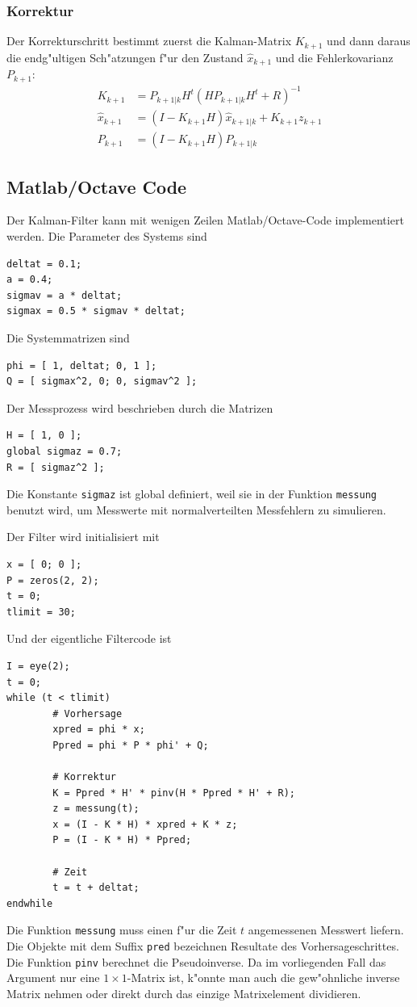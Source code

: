 \subsubsection{Korrektur}
Der Korrekturschritt bestimmt zuerst die Kalman-Matrix $K_{k+1}$ und
dann daraus die endg"ultigen Sch"atzungen f"ur den Zustand
$\hat x_{k+1}$ und die Fehlerkovarianz $P_{k+1}$:
\begin{align*}
K_{k+1}&=P_{k+1|k}H^t(HP_{k+1|k}H^t+R)^{-1}
\\
\hat x_{k+1}&= (I-K_{k+1}H)\hat x_{k+1|k} + K_{k+1}z_{k+1}
\\
P_{k+1}&=(I-K_{k+1}H)P_{k+1|k}
\end{align*}

\subsection{Matlab/Octave Code}
Der Kalman-Filter kann mit wenigen Zeilen Matlab/Octave-Code implementiert
werden.
Die Parameter des Systems sind
\begin{verbatim}
deltat = 0.1;
a = 0.4;
sigmav = a * deltat;
sigmax = 0.5 * sigmav * deltat;
\end{verbatim}
Die Systemmatrizen sind
\begin{verbatim}
phi = [ 1, deltat; 0, 1 ];
Q = [ sigmax^2, 0; 0, sigmav^2 ];
\end{verbatim}
Der Messprozess wird beschrieben durch die Matrizen
\begin{verbatim}
H = [ 1, 0 ];
global sigmaz = 0.7;
R = [ sigmaz^2 ];
\end{verbatim}
Die Konstante \verb+sigmaz+ ist global definiert, weil sie in der
Funktion \verb+messung+ benutzt wird, um Messwerte mit normalverteilten
Messfehlern zu simulieren.

Der Filter wird initialisiert mit
\begin{verbatim}
x = [ 0; 0 ];
P = zeros(2, 2);
t = 0;
tlimit = 30;
\end{verbatim}
Und der eigentliche Filtercode ist
\begin{verbatim}
I = eye(2);
t = 0;
while (t < tlimit)
        # Vorhersage
        xpred = phi * x;
        Ppred = phi * P * phi' + Q;

        # Korrektur
        K = Ppred * H' * pinv(H * Ppred * H' + R);
        z = messung(t);
        x = (I - K * H) * xpred + K * z;
        P = (I - K * H) * Ppred;

        # Zeit
        t = t + deltat;
endwhile
\end{verbatim}
Die Funktion \verb+messung+ muss einen f"ur die Zeit $t$ angemessenen
Messwert liefern.
Die Objekte mit dem Suffix \verb+pred+ bezeichnen Resultate des
Vorhersageschrittes.
Die Funktion \verb+pinv+ berechnet die Pseudoinverse.
Da im vorliegenden Fall das Argument nur eine $1\times 1$-Matrix ist,
k"onnte man auch die gew"ohnliche inverse Matrix nehmen oder direkt
durch das einzige Matrixelement dividieren.

